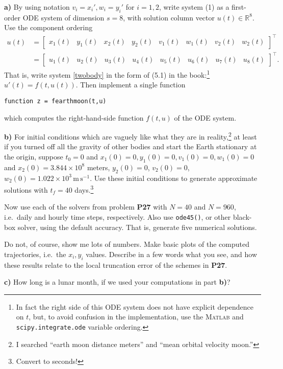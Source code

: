 \documentclass[12pt]{amsart}
\newcommand{\RR}{\mathbb{R}}
\newcommand{\Matlab}{\textsc{Matlab}\xspace}
\newcommand{\epart}[1]{\medskip\noindent\textbf{#1)}\quad }
\begin{document}
\epart{a} By using notation $v_i=x_i', w_i=y_i'$ for $i=1,2$, write system (1) as a first-order ODE system of dimension $s=8$, with solution column vector $u(t)\in\RR^8$.  Use the component ordering
\begin{align*}
u(t) &= \begin{bmatrix} x_1(t) & y_1(t) & x_2(t) & y_2(t) & v_1(t) & w_1(t) & v_2(t) & w_2(t) \end{bmatrix}^\top \\
     &= \begin{bmatrix} u_1(t) & u_2(t) & u_3(t) & u_4(t) & u_5(t) & u_6(t) & u_7(t) & u_8(t) \end{bmatrix}^\top.
\end{align*}
That is, write system \eqref{twobody} in the form of (5.1) in the book:\footnote{In fact the right side of this ODE system does not have explicit dependence on $t$, but, to avoid confusion in the implementation, use the \Matlab and \texttt{scipy.integrate.ode} variable ordering.} $u'(t) = f(t,u(t))$.  Then implement a single function

\centerline{\texttt{function z = fearthmoon(t,u)}}

\noindent which computes the right-hand-side function $f(t,u)$ of the ODE system.

\epart{b}  For initial conditions which are vaguely like what they are in reality,\footnote{I searched ``earth moon distance meters'' and ``mean orbital velocity moon.''} at least if you turned off all the gravity of other bodies and start the Earth stationary at the origin, suppose $t_0=0$ and $x_1(0)=0,y_1(0)=0,v_1(0)=0,w_1(0)=0$ and $x_2(0)=3.844\times 10^8$ meters, $y_2(0)=0$, $v_2(0)=0$, $w_2(0)=1.022\times 10^3 \,\text{m}\,\text{s}^{-1}$.  Use these initial conditions to generate approximate solutions with $t_f=40$ days.\footnote{Convert to seconds!}

Now use each of the solvers from problem \textbf{P27} with $N=40$ and $N=960$, i.e.~daily and hourly time steps, respectively.  Also use \texttt{ode45()}, or other black-box solver, using the default accuracy.  That is, generate five numerical solutions.

Do not, of course, show me lots of numbers.  Make basic plots of the computed trajectories, i.e.~the $x_i,y_i$ values.  Describe in a few words what you see, and how these results relate to the local truncation error of the schemes in \textbf{P27}.

\epart{c}  How long is a lunar month, if we used your computations in part \textbf{b)}?  
\end{document}
